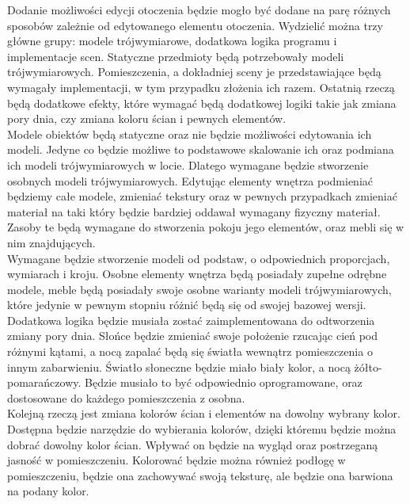 \documentclass{article} %
\begin{document}
        Dodanie możliwości edycji otoczenia będzie mogło być dodane na parę różnych sposobów zależnie od edytowanego elementu otoczenia. Wydzielić można trzy główne grupy: modele trójwymiarowe, dodatkowa logika programu i implementacje scen. Statyczne przedmioty będą potrzebowały modeli trójwymiarowych. Pomieszczenia, a dokładniej sceny je przedstawiające będą wymagały implementacji, w tym przypadku złożenia ich razem. Ostatnią rzeczą będą dodatkowe efekty, które wymagać będą dodatkowej logiki takie jak zmiana pory dnia, czy zmiana koloru ścian i pewnych elementów.
        \\
        
        Modele obiektów będą statyczne oraz nie będzie możliwości edytowania ich modeli. Jedyne co będzie możliwe to podstawowe skalowanie ich oraz podmiana ich modeli trójwymiarowych w locie. Dlatego wymagane będzie stworzenie osobnych modeli trójwymiarowych. Edytując elementy wnętrza podmieniać będziemy całe modele, zmieniać tekstury oraz w pewnych przypadkach zmieniać materiał na taki który będzie bardziej oddawał wymagany fizyczny materiał. Zasoby te będą wymagane do stworzenia pokoju jego elementów, oraz mebli się w nim znajdujących.
        \\
        
        Wymagane będzie stworzenie modeli od podstaw, o odpowiednich proporcjach, wymiarach i kroju. Osobne elementy wnętrza będą posiadały zupełne odrębne modele, meble będą posiadały swoje osobne warianty modeli trójwymiarowych, które jedynie w pewnym stopniu różnić będą się od swojej bazowej wersji.
        \\
        
        Dodatkowa logika będzie musiała zostać zaimplementowana do odtworzenia zmiany pory dnia. Słońce będzie zmieniać swoje położenie rzucając cień pod różnymi kątami, a nocą zapalać będą się światła wewnątrz pomieszczenia o innym zabarwieniu. Światło słoneczne będzie miało biały kolor, a nocą żółto-pomarańczowy. Będzie musiało to być odpowiednio oprogramowane, oraz dostosowane do każdego pomieszczenia z osobna.
        \\
        
        Kolejną rzeczą jest zmiana kolorów ścian i elementów na dowolny wybrany kolor. Dostępna będzie narzędzie do wybierania kolorów, dzięki któremu będzie można dobrać dowolny kolor ścian. Wpływać on będzie na wygląd oraz postrzeganą jasność w pomieszczeniu. Kolorować będzie można również podłogę w pomieszczeniu, będzie ona zachowywać swoją teksturę, ale będzie ona barwiona na podany kolor.
        \\
        
\end{document}
